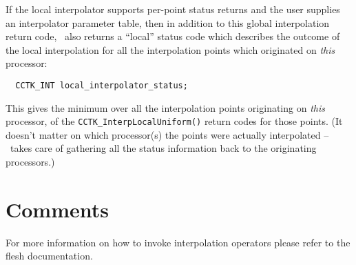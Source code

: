 \documentclass{article}
\begin{document}
If the local interpolator supports per-point status returns
and the user supplies an interpolator parameter table,
then in addition to this global interpolation return code,
\InterpGridArrays\ also returns a ``local'' status code which
describes the outcome of the local interpolation for all the
interpolation points which originated on {\em this\/} processor:
\begin{verbatim}
  CCTK_INT local_interpolator_status;
\end{verbatim}
This gives the minimum over all the interpolation points originating
on {\em this\/} processor, of the \verb|CCTK_InterpLocalUniform()|
return codes for those points.  (It doesn't matter on which processor(s)
the points were actually interpolated -- \InterpGridArrays\ takes care
of gathering all the status information back to the originating processors.)


\section{Comments}
For more information on how to invoke interpolation operators please refer
to the flesh documentation.

\end{document}
